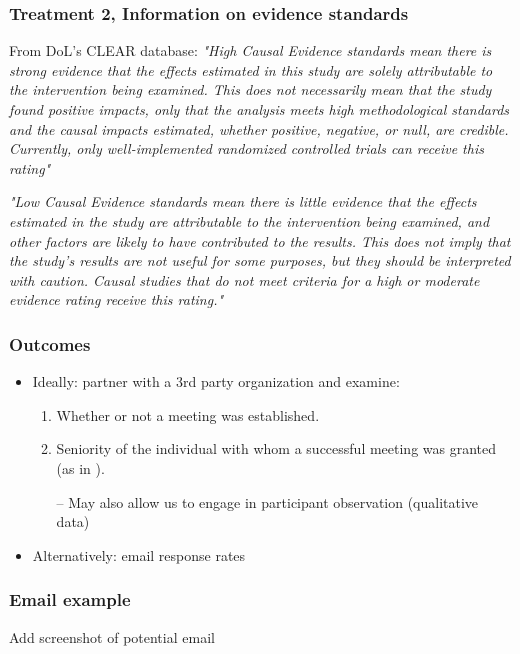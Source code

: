 \documentclass[usenames,dvipsnames]{beamer}
\begin{document}
\begin{frame}
\frametitle{Treatment 2, Information on evidence standards}
\scriptsize
From DoL's CLEAR database:
\bigbreak
\textit{"High Causal Evidence standards mean there is strong evidence that the effects estimated in this study are solely attributable to the intervention being examined. This does not necessarily mean that the study found positive impacts, only that the analysis meets high methodological standards and the causal impacts estimated, whether positive, negative, or null, are credible. Currently, only well-implemented randomized controlled trials can receive this rating"}

\textit{"Low Causal Evidence standards mean there is little evidence that the effects estimated in the study are attributable to the intervention being examined, and other factors are likely to have contributed to the results. This does not imply that the study's results are not useful for some purposes, but they should be interpreted with caution. Causal studies that do not meet criteria for a high or moderate evidence rating receive this rating."}

\end{frame}



\begin{frame}
\frametitle{Outcomes}

\begin{itemize}
\item Ideally: partner with a \textcolor{Cerulean}{3rd party organization} and examine: 
\begin{enumerate} 
\item Whether or not a \textcolor{Cerulean}{meeting was established}. 
\item Seniority of the individual with whom a successful meeting was granted (as in \citet{kalla2016campaign}).
\pause
\item [--] May also allow us to engage in participant observation (qualitative data)
\end{enumerate}
\pause
\vspace{1cm}
\item Alternatively: \textcolor{Cerulean}{email response rates}
\end{itemize}

\end{frame}



\begin{frame}
\frametitle{Email example}

Add screenshot of potential email

\end{frame}
\end{document}
